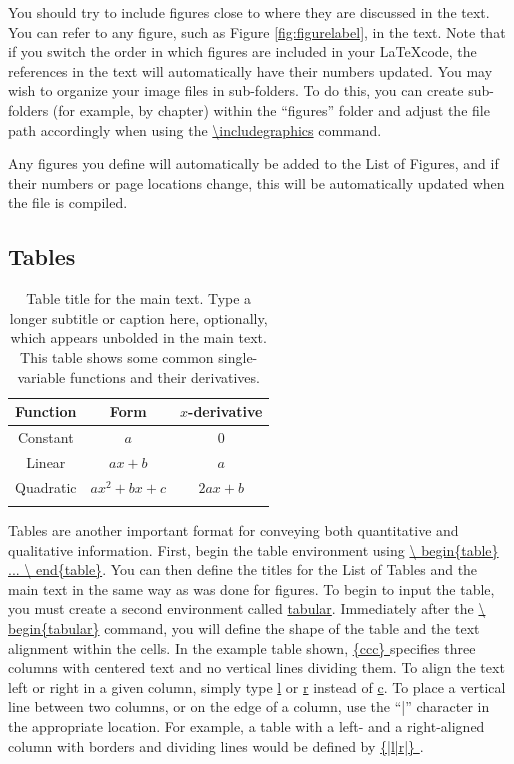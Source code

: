 You should try to include figures close to where they are discussed in the text. You can refer to any figure, such as Figure \ref{fig:figurelabel}, in the text. Note that if you switch the order in which figures are included in your \LaTeX code, the references in the text will automatically have their numbers updated. You may wish to organize your image files in sub-folders. To do this, you can create sub-folders (for example, by chapter) within the ``figures'' folder and adjust the file path accordingly when using the \url{\includegraphics} command.

Any figures you define will automatically be added to the List of Figures, and if their numbers or page locations change, this will be automatically updated when the file is compiled.



\subsection{Tables}

\begin{table}
\caption[Table title for the List of Tables]{ 
    Table title for the main text. %
    \textmd{Type a longer subtitle or caption here, optionally, which appears unbolded in the main text. This table shows some common single-variable functions and their derivatives.}
    }\begin{center}
\begin{tabular}{ccc}
Function & Form & $x$-derivative \\
\hline
Constant & $a$ & 0 \\
Linear & $ax + b$ & $a$  \\
Quadratic & $ax^2 + bx + c$ & $2ax + b$  \\
\label{tab:tablelabel}
\end{tabular}
\end{center}
\end{table}

Tables are another important format for conveying both quantitative and qualitative information. First, begin the table environment using \url{\ begin{table} ... \ end{table}}. You can then define the titles for the List of Tables and the main text in the same way as was done for figures. To begin to input the table, you must create a second environment called \url{tabular}. Immediately after the \url{\ begin{tabular}} command, you will define the shape of the table and the text alignment within the cells. In the example table shown, \url{ {ccc} } specifies three columns with centered text and no vertical lines dividing them. To align the text left or right in a given column, simply type \url{l} or \url{r} instead of \url{c}. To place a vertical line between two columns, or on the edge of a column, use the ``|'' character in the appropriate location. For example, a table with a left- and a right-aligned column with borders and dividing lines would be defined by \url{ {|l|r|} }. 

